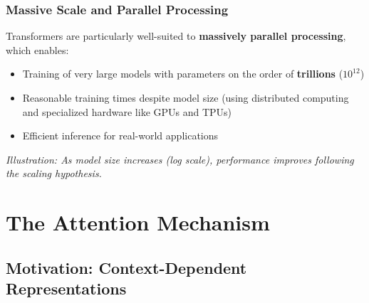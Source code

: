 \documentclass[11pt,a4paper]{article}
\theoremstyle{definition}
\theoremstyle{plain}
\theoremstyle{remark}
\begin{document}
\subsubsection{Massive Scale and Parallel Processing}

Transformers are particularly well-suited to \textbf{massively parallel processing}, which enables:

\begin{itemize}
    \item Training of very large models with parameters on the order of \textbf{trillions} ($10^{12}$)
    \item Reasonable training times despite model size (using distributed computing and specialized hardware like GPUs and TPUs)
    \item Efficient inference for real-world applications
\end{itemize}

\begin{center}
\end{center}

\begin{center}
\textit{Illustration: As model size increases (log scale), performance improves following the scaling hypothesis.}
\end{center}

\section{The Attention Mechanism}

\subsection{Motivation: Context-Dependent Representations}
\end{document}
